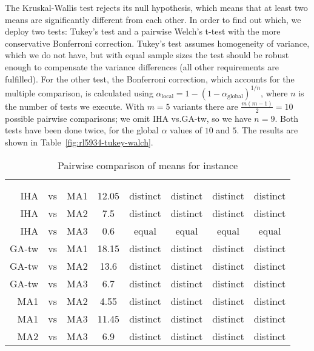 \documentclass[thesis.tex]{subfiles}
\begin{document}
The Kruskal-Wallis test rejects its null hypothesis, which means that at least two means are significantly different from each other. In order to find out which, we deploy two tests: Tukey's test and a pairwise Welch's t-test with the more conservative Bonferroni correction. Tukey's test assumes homogeneity of variance, which we do not have, but with equal sample sizes the test should be robust enough to compensate the variance differences (all other requirements are fulfilled). For the other test, the Bonferroni correction, which accounts for the multiple comparison, is calculated using $\alpha_{\text{local}} = 1 - (1 - \alpha_{\text{global}})^{1/n}$, where $n$ is the number of tests we execute. With $m=5$ variants there are $\frac{m(m-1)}{2} = 10$ possible pairwise comparisons; we omit \gls{IHA} vs.\@ \gls{GA-tw}, so we have $n=9$. Both tests have been done twice, for the global $\alpha$ values of $10$ and $5$. The results are shown in Table~\vref{fig:rl5934-tukey-walch}.
\begin{table}[htbp]
   \caption{Pairwise comparison of means for instance \CurrentInstance}
   \label{fig:\CurrentInstanceFileEscaped-tukey-walch}
   \centering\small
      \begin{tabular}{r@{\ }c@{\ }l S[table-format=2.2] c c c c} \toprule
         &&&                          &  & \\ \cmidrule(lr){5-6}\cmidrule(lr){7-8}
         &&&  &  &  &  &  \\ \midrule

         \gls{IHA} &vs& \gls{MA1}   & 12.05 & distinct & distinct & distinct & distinct \\
         \gls{IHA} &vs& \gls{MA2}   &  7.5  & distinct & distinct & distinct & distinct \\
         \gls{IHA} &vs& \gls{MA3}   &  0.6  &  equal   &  equal   &  equal   &  equal   \\
         \gls{GA-tw} &vs& \gls{MA1} & 18.15 & distinct & distinct & distinct & distinct \\
         \gls{GA-tw} &vs& \gls{MA2} & 13.6  & distinct & distinct & distinct & distinct \\
         \gls{GA-tw} &vs& \gls{MA3} &  6.7  & distinct & distinct & distinct & distinct \\
         \gls{MA1} &vs& \gls{MA2}   &  4.55 & distinct & distinct & distinct & distinct \\
         \gls{MA1} &vs& \gls{MA3}   & 11.45 & distinct & distinct & distinct & distinct \\
         \gls{MA2} &vs& \gls{MA3}   &  6.9  & distinct & distinct & distinct & distinct \\
         \bottomrule
      \end{tabular}
\end{table}
\end{document}
